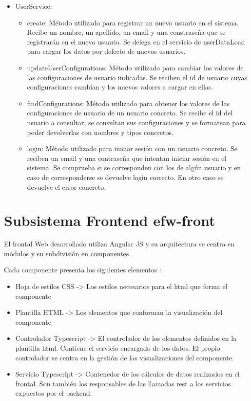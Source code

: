 \documentclass[12pt, a4paper, twoside]{book}
\begin{document}
\begin{itemize}
\begin{itemize}
		\end{itemize}
		\item UserService: 
		\begin{itemize}
			\item create: Método utilizado para registrar un nuevo usuario en el sistema. Recibe un nombre, un apellido, un email y una constraseña que se registrarán en el nuevo usuario. Se delega en el servicio de userDataLoad para cargar los datos por defecto de nuevos usuarios.
			\item updateUserConfigurations: Método utilizado para cambiar los valores de las configuraciones de usuario indicadas. Se reciben el id de usuario cuyas configuraciones cambian y los nuevos valores a cargar en ellas.
			\item findConfigurations: Método utilizado para obtener los valores de las configuraciones de usuario de un usuario concreto. Se recibe el id del usuario a consultar, se consultan sus configuraciones y se formatean para poder devolverlas con nombres y tipos concretos.
			\item login: Método utilizado para iniciar sesión con un usuario concreto. Se reciben un email y una contraseña que intentan iniciar sesión en el sistema. Se comprueba si se corresponden con los de algún usuario y en caso de corresponderse se devuelve login correcto. En otro caso se devuelve el error concreto.
		\end{itemize}
	\end{itemize}
	
	\section{Subsistema Frontend efw-front}
	
	El frontal Web desarrollado utiliza Angular JS y su arquitectura se centra en módulos y su subdivisión en componentes.
	
	Cada componente presenta los siguientes elementos : 
	\begin{itemize}
		\item Hoja de estilos CSS -> Los estilos necesarios para el html que forma el componente
		\item Plantilla HTML -> Los elementos que conforman la visualización del componente
		\item Controlador Typescript -> El controlador de los elementos definidos en la plantilla html. Contiene el servicio encargado de los datos. El propio controlador se centra en la gestión de las visualizaciones del componente.
		\item Servicio Typescript -> Contenedor de los cálculos de datos realizados en el frontal. Son también los responsables de las llamadas rest a los servicios expuestos por el backend.
	\end{itemize}
\end{document}
